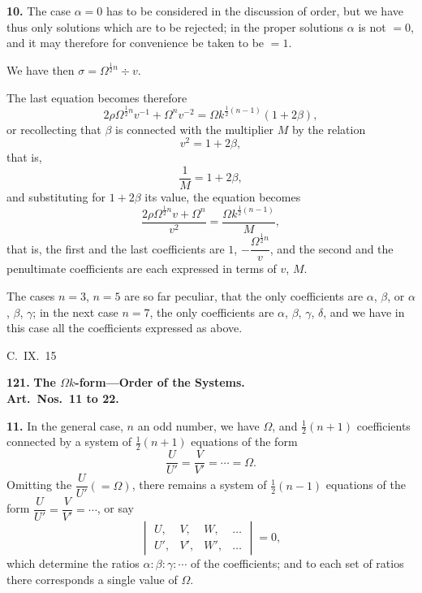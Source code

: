\documentclass[11pt,a4paper]{article}
\theoremstyle{plain}
\begin{document}
\medskip
\noindent\textbf{10.} The case $\alpha = 0$ has to be considered in the discussion of order, but we have thus only solutions which are to be rejected; in the proper solutions $\alpha$ is not $= 0$, and it may therefore for convenience be taken to be $= 1$.

We have then $\sigma = \Omega^{\frac{1}{2}n} \div v$.

The last equation becomes therefore
\[
2\rho\Omega^{\frac{1}{2}n}v^{-1} + \Omega^n v^{-2} = \Omega k^{\frac{1}{2}(n-1)}(1 + 2\beta),
\]
or recollecting that $\beta$ is connected with the multiplier $M$ by the relation
\[
v^2 = 1 + 2\beta,
\]
that is,
\[
\frac{1}{M} = 1 + 2\beta,
\]
and substituting for $1 + 2\beta$ its value, the equation becomes
\[
\frac{2\rho\Omega^{\frac{1}{2}n}v + \Omega^n}{v^2} = \frac{\Omega k^{\frac{1}{2}(n-1)}}{M},
\]
that is, the first and the last coefficients are $1$, $-\dfrac{\Omega^{\frac{1}{2}n}}{v}$, and the second and the penultimate coefficients are each expressed in terms of $v$, $M$.

The cases $n = 3$, $n = 5$ are so far peculiar, that the only coefficients are $\alpha$, $\beta$, or $\alpha$, $\beta$, $\gamma$; in the next case $n = 7$, the only coefficients are $\alpha$, $\beta$, $\gamma$, $\delta$, and we have in this case all the coefficients expressed as above.

\begin{flushright}
C.~IX.~15
\end{flushright}



\newpage
\noindent\textbf{121.} \textbf{The $\Omega k$-form---Order of the Systems.}\\
\textbf{Art.~Nos.~11 to 22.}

\medskip
\noindent\textbf{11.} In the general case, $n$ an odd number, we have $\Omega$, and $\frac{1}{2}(n + 1)$ coefficients connected by a system of $\frac{1}{2}(n + 1)$ equations of the form
\[
\frac{U}{U'} = \frac{V}{V'} = \cdots = \Omega.
\]
Omitting the $\dfrac{U}{U'} (= \Omega)$, there remains a system of $\frac{1}{2}(n - 1)$ equations of the form $\dfrac{U}{U'} = \dfrac{V}{V'} = \cdots$, or say
\[
\begin{vmatrix} U, & V, & W, & \ldots \\ U', & V', & W', & \ldots \end{vmatrix} = 0,
\]
which determine the ratios $\alpha : \beta : \gamma : \cdots$ of the coefficients; and to each set of ratios there corresponds a single value of $\Omega$.
\end{document}
